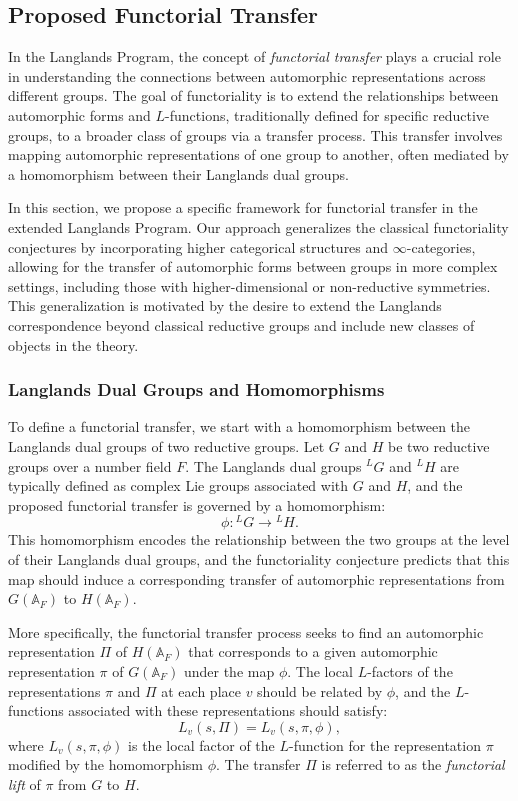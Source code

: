 \documentclass{article}
\theoremstyle{remark}
\begin{document}
\subsection{Proposed Functorial Transfer}

In the Langlands Program, the concept of \emph{functorial transfer} plays a crucial role in understanding the connections between automorphic representations across different groups. The goal of functoriality is to extend the relationships between automorphic forms and $L$-functions, traditionally defined for specific reductive groups, to a broader class of groups via a transfer process. This transfer involves mapping automorphic representations of one group to another, often mediated by a homomorphism between their Langlands dual groups.

In this section, we propose a specific framework for functorial transfer in the extended Langlands Program. Our approach generalizes the classical functoriality conjectures by incorporating higher categorical structures and $\infty$-categories, allowing for the transfer of automorphic forms between groups in more complex settings, including those with higher-dimensional or non-reductive symmetries. This generalization is motivated by the desire to extend the Langlands correspondence beyond classical reductive groups and include new classes of objects in the theory.

\subsubsection{Langlands Dual Groups and Homomorphisms}

To define a functorial transfer, we start with a homomorphism between the Langlands dual groups of two reductive groups. Let $G$ and $H$ be two reductive groups over a number field $F$. The Langlands dual groups ${}^L G$ and ${}^L H$ are typically defined as complex Lie groups associated with $G$ and $H$, and the proposed functorial transfer is governed by a homomorphism:
\[
\phi: {}^L G \to {}^L H.
\]
This homomorphism encodes the relationship between the two groups at the level of their Langlands dual groups, and the functoriality conjecture predicts that this map should induce a corresponding transfer of automorphic representations from $G(\mathbb{A}_F)$ to $H(\mathbb{A}_F)$.

More specifically, the functorial transfer process seeks to find an automorphic representation $\Pi$ of $H(\mathbb{A}_F)$ that corresponds to a given automorphic representation $\pi$ of $G(\mathbb{A}_F)$ under the map $\phi$. The local $L$-factors of the representations $\pi$ and $\Pi$ at each place $v$ should be related by $\phi$, and the $L$-functions associated with these representations should satisfy:
\[
L_v(s, \Pi) = L_v(s, \pi, \phi),
\]
where $L_v(s, \pi, \phi)$ is the local factor of the $L$-function for the representation $\pi$ modified by the homomorphism $\phi$. The transfer $\Pi$ is referred to as the \emph{functorial lift} of $\pi$ from $G$ to $H$.
\end{document}

